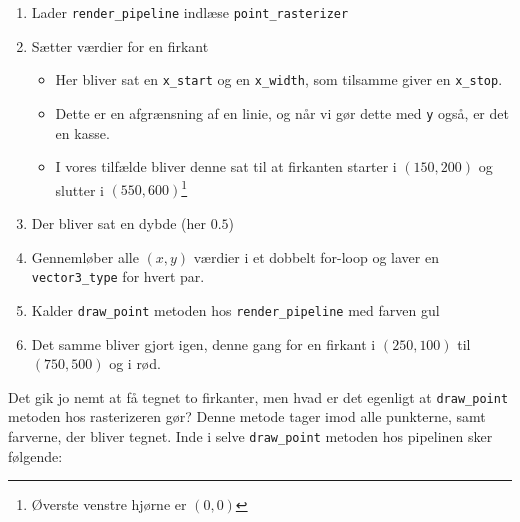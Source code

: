 \documentclass[a4paper, 10pt]{article}
\begin{document}
\begin{enumerate}
\item Lader \texttt{render\_pipeline} indlæse \texttt{point\_rasterizer}
\item Sætter værdier for en firkant
    \begin{itemize}
    \item Her bliver sat en \texttt{x\_start} og en \texttt{x\_width}, som tilsamme giver en \texttt{x\_stop}. 
    \item Dette er en afgrænsning af en linie, og når vi gør dette med \texttt{y} også, er det en kasse. 
    \item I vores tilfælde bliver denne sat til at firkanten starter i $(150, 200)$ og slutter i $(550, 600)$\footnote{Øverste venstre hjørne er $(0,0)$}
    \end{itemize}
\item Der bliver sat en dybde (her $0.5$)
\item Gennemløber alle $(x,y)$ værdier i et dobbelt for-loop og laver en \texttt{vector3\_type} for hvert par.
\item Kalder \texttt{draw\_point} metoden hos \texttt{render\_pipeline} med farven gul
\item Det samme bliver gjort igen, denne gang for en firkant i $(250, 100)$ til $(750, 500)$ og i rød.
\end{enumerate}

Det gik jo nemt at få tegnet to firkanter, men hvad er det egenligt at \texttt{draw\_point} metoden hos rasterizeren gør?
Denne metode tager imod alle punkterne, samt farverne, der bliver tegnet.
Inde i selve \texttt{draw\_point} metoden hos pipelinen sker følgende:
\end{document}

